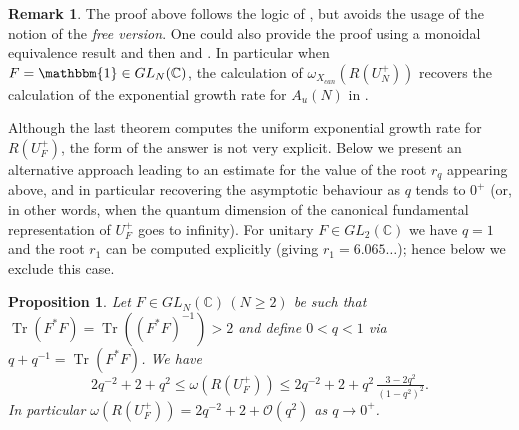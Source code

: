 \documentclass[11 pt, leqno]{amsart}
\newcommand{\mc}{\mathcal}
\newcommand{\I}{\mathbbm{1}}
\newcommand{\CC}{\mathbb{C}}
\DeclareMathOperator{\Tr}{Tr}
\newtheorem{proposition}[theorem]{Proposition}
\theoremstyle{definition}
\newtheorem{remark}[theorem]{Remark}
\numberwithin{equation}{section}
\begin{document}
\begin{remark}
	The proof above  follows the logic of \cite{BanicaVergnioux}, but avoids the usage of the notion of the \emph{free version}. One could also provide the proof using a monoidal equivalence result \cite[Corollary 6.3]{BichonDeRijdtVaes} and then \cite[Th{\'e}or{\`e}me 1]{BanicaUnitary} and \cite[Theorem 3.3]{BanicaVergnioux}. In particular when $F=\I\in GL_N(\CC)$, the calculation of $\omega_{X_{can}}(R(U_N^+))$ recovers the calculation of the exponential growth rate for $A_u(N)$ in \cite{BanicaVergnioux}. 
\end{remark}


Although the last theorem computes the uniform exponential growth rate for $R(U_F^+)$, the form of the answer is not very explicit. Below we present an alternative approach leading to an estimate for the value of the root $r_q$ appearing above, and in particular recovering the asymptotic behaviour as $q$ tends to $0^+$ (or, in other words, when the quantum dimension of the canonical fundamental representation of $U_F^+$ goes to infinity). For unitary $F\in GL_2(\CC)$ we have $q=1$ and the root $r_1$ can be computed explicitly (giving $r_1=6.065\dotsc$); hence below we exclude this case.

\begin{proposition}\label{prop16}
	Let $F\in GL_N(\CC)\,(N\ge 2)$ be such that $\Tr(F^*F)=\Tr( (F^*F)^{-1})>2$ and define $0<q< 1$ via $q+q^{-1}=\Tr(F^*F)$.
	We have
	\[
	2q^{-2}+2 +q^2\le 
	\omega(R(U_F^+)) \le
2q^{-2}+2+q^2\, \tfrac{3-2q^2}{(1-q^2)^2}.
	\]
	In particular $\omega(R(U_F^+)) = 2 q^{-2}+ 2+\mc{O}(q^2)$ as $q\to 0^+$.
\end{proposition}
\end{document}
